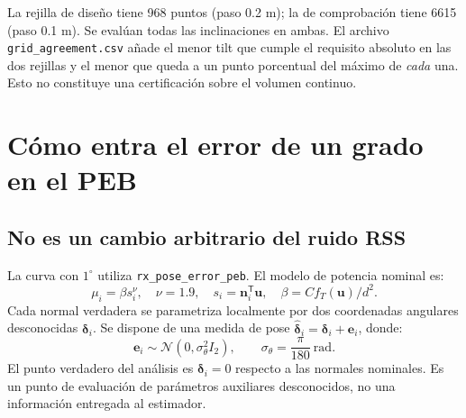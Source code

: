 \documentclass[11pt,a4paper]{article}
\begin{document}
La rejilla de diseño tiene 968 puntos (paso 0.2 m); la de comprobación tiene 6615 (paso 0.1 m). Se evalúan todas las inclinaciones en ambas. El archivo \texttt{grid\_agreement.csv} añade el menor tilt que cumple el requisito absoluto en las dos rejillas y el menor que queda a un punto porcentual del máximo de \emph{cada} una. Esto no constituye una certificación sobre el volumen continuo.

\section{Cómo entra el error de un grado en el PEB}
\subsection{No es un cambio arbitrario del ruido RSS}
La curva con $1^\circ$ utiliza \texttt{rx\_pose\_error\_peb}. El modelo de potencia nominal es:
\begin{equation}
 \mu_i=\beta s_i^\nu,\quad \nu=1.9,\quad s_i=\mathbf n_i^{\mathsf T}\mathbf u,\quad
 \beta=Cf_T(\mathbf u)/d^2.
\end{equation}
Cada normal verdadera se parametriza localmente por dos coordenadas angulares desconocidas $\boldsymbol\delta_i$. Se dispone de una medida de pose $\hat{\boldsymbol\delta}_i=\boldsymbol\delta_i+\mathbf e_i$, donde:
\begin{equation}
 \mathbf e_i\sim\mathcal N(0,\sigma_\theta^2I_2),\qquad
 \sigma_\theta=\frac\pi{180}\ \mathrm{rad}.
\end{equation}
El punto verdadero del análisis es $\boldsymbol\delta_i=0$ respecto a las normales nominales. Es un punto de evaluación de parámetros auxiliares desconocidos, no una información entregada al estimador.
\end{document}
